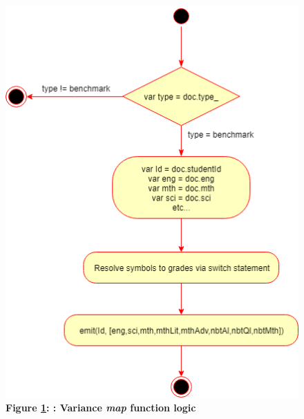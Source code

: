 \begin{figure}[H]
    \centering
    \begin{mdframed}
        \centering
        \includegraphics[scale=0.8]{./resources/figures/variance-map.png}
    \end{mdframed}
    \caption[Variance Map Function]{\textbf{Figure \ref{fig-variance-map-function}: : Variance \textit{map} function logic}}
    \label{fig-variance-map-function}
\end{figure}
